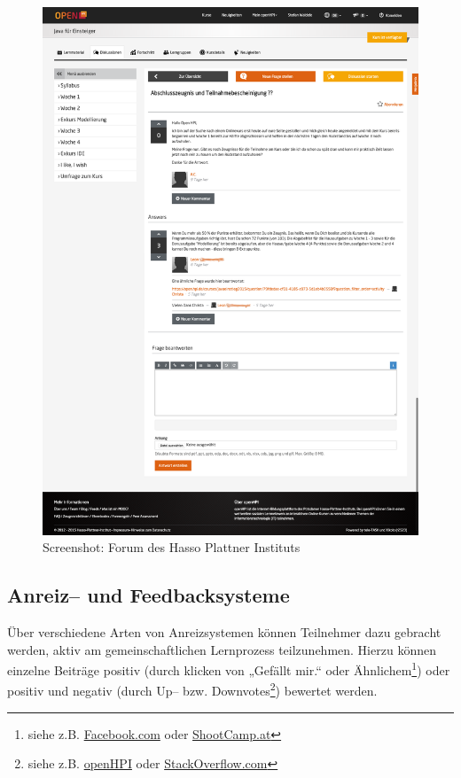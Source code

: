 \begin{figure}[p]
\begin{center}
\includegraphics[width=\textwidth]{hpiforum.png}
\caption{Screenshot: Forum des Hasso Plattner Instituts}
\label{fig:hpi}
\end{center}
\end{figure}

\subsection{Anreiz– und Feedbacksysteme} %
\label{sub:infentives}

Über verschiedene Arten von Anreizsystemen können Teilnehmer dazu gebracht werden, aktiv am gemeinschaftlichen Lernprozess teilzunehmen. Hierzu können einzelne Beiträge positiv (durch klicken von „Gefällt mir.“ oder Ähnlichem\footnote{siehe z.B. \url{Facebook.com} oder \url{ShootCamp.at}}) oder positiv und negativ (durch Up– bzw. Downvotes\footnote{siehe z.B. \url{openHPI} oder \url{StackOverflow.com}}) bewertet werden.

